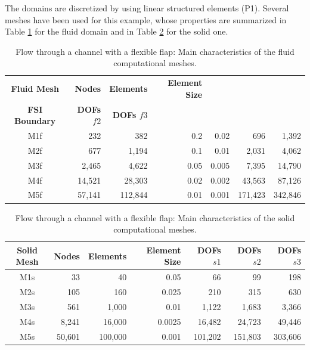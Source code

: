 \documentclass[11pt,english]{article}
\begin{document}
The domains are discretized by using linear structured elements (P1). Several meshes have been used for this example, whose properties are summarized in Table \ref{tab:flowbar_fluid_meshes} for the fluid domain and in Table \ref{tab:flowbar_solid_meshes} for the solid one.
\begin{table}[h]
    \centering
        \begin{tabular}{crrrrrr}
           \toprule
           \textbf{Fluid Mesh} &  \textbf{Nodes} &  \textbf{Elements} & \textbf{Element Size} & \makecell{\textbf{Element Size} \\ \textbf{FSI Boundary}} & \textbf{DOFs $f2$} & \textbf{DOFs $f3$} \\
           \midrule
           M1f & 232    & 382     & 0.2  & 0.02  & 696     & 1,392   \\
           M2f & 677    & 1,194   & 0.1  & 0.01  & 2,031   & 4,062   \\
           M3f & 2,465  & 4,622   & 0.05 & 0.005 & 7,395   & 14,790  \\
           M4f & 14,521  & 28,303  & 0.02 & 0.002 & 43,563  & 87,126  \\
           M5f & 57,141 & 112,844 & 0.01 & 0.001 & 171,423 & 342,846 \\
           \bottomrule
       \end{tabular}
    \caption{Flow through a channel with a flexible flap: Main characteristics of the fluid computational meshes.}
    \label{tab:flowbar_fluid_meshes}
\end{table}

\begin{table}[h]
    \centering
        \begin{tabular}{crrrrrr}
           \toprule
           \textbf{Solid Mesh} &  \textbf{Nodes} &  \textbf{Elements} & \textbf{Element Size} & \textbf{DOFs $s1$} & \textbf{DOFs $s2$}  & \textbf{DOFs $s3$} \\
           \midrule
           M1s & 33     & 40      & 0.05   & 66      & 99      & 198   \\
           M2s & 105    & 160     & 0.025  & 210     & 315     & 630   \\
           M3s & 561    & 1,000   & 0.01   & 1,122   & 1,683   & 3,366   \\
           M4s & 8,241  & 16,000  & 0.0025 & 16,482  & 24,723  & 49,446   \\
           M5s & 50,601 & 100,000 & 0.001  & 101,202 & 151,803 & 303,606   \\
           \bottomrule
       \end{tabular}
    \caption{Flow through a channel with a flexible flap: Main characteristics of the solid computational meshes.}
    \label{tab:flowbar_solid_meshes}
\end{table}
\end{document}
